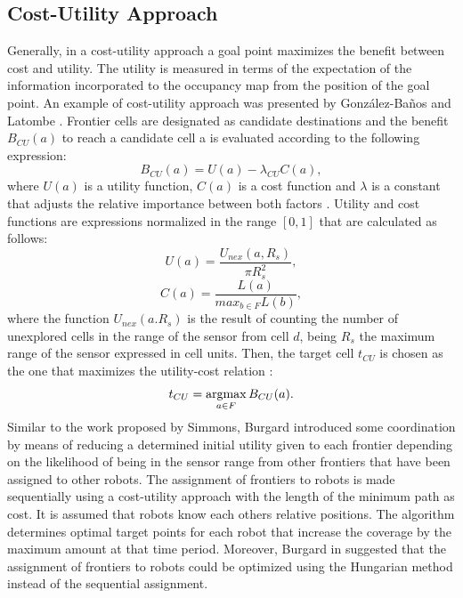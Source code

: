 \subsection{Cost-Utility Approach}
Generally, in a cost-utility approach a goal point maximizes the benefit between cost and utility. The utility is measured in terms of the expectation of the information incorporated to the occupancy map from the position of the goal point. An example of cost-utility approach was presented by González-Baños and Latombe \cite{GonzlezBaos2002}. Frontier cells are designated as candidate destinations and the benefit $B_{CU}(a)$ to reach a candidate cell a is evaluated according to the following expression:
\begin{equation}
B_{CU}(a) = U(a) - \lambda_{CU}C(a),
\label{equation:cost-utility}
\end{equation}
where $U(a)$ is a utility function, $C(a)$ is a cost function and $\lambda$ is a constant that adjusts the relative importance between both factors \cite{Julia2012}. Utility and cost functions are expressions normalized in the range $\left[0, 1\right]$ that are calculated as follows:
\begin{equation}
U(a) = \frac{U_{nex}(a, R_{s})}{\pi R_{s}^{2}},
\end{equation}
\begin{equation}
C(a) = \frac{L(a)}{max_{b \in F}L(b)},
\end{equation}
where the function $U_{nex}(a. R_{s})$ is the result of counting the number of unexplored cells in the range of the sensor from cell $d$, being $R_{s}$ the maximum range of the sensor expressed in cell units.
Then, the target cell $t_{CU}$ is chosen as the one that maximizes the utility-cost relation \cite{Julia2012}:
\begin{equation}
t_{CU} = \operatorname*{argmax}_{a \in F} B_{CU}(a).
\end{equation}
Similar to the work proposed by Simmons, Burgard \cite{Burgard2000} introduced some coordination by means of reducing a determined initial utility given to each frontier depending on the likelihood of being in the sensor range from other frontiers that have been assigned to other robots. The assignment of frontiers to robots is made sequentially using a cost-utility approach with the length of the minimum path as cost. It is assumed that robots know each others relative positions. The algorithm determines optimal target points for each robot that increase the coverage by the maximum amount at that time period. Moreover, Burgard in \cite{Burgard2005} suggested that the assignment of frontiers to robots could be optimized using the Hungarian method \cite{Kuhn1955} instead of the sequential assignment.


